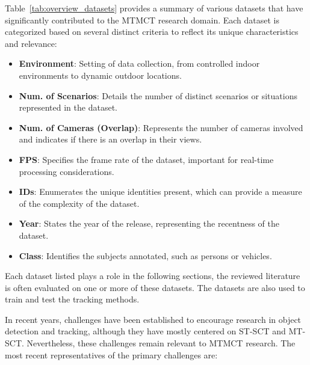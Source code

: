 Table~\ref{tab:overview_datasets} provides a summary of various datasets that have significantly contributed to the MTMCT research domain. Each dataset is categorized based on several distinct criteria to reflect its unique characteristics and relevance:

\begin{itemize}
    \item \textbf{Environment}: Setting of data collection, from controlled indoor environments to dynamic outdoor locations.
    \item \textbf{Num. of Scenarios}: Details the number of distinct scenarios or situations represented in the dataset.
    \item \textbf{Num. of Cameras (Overlap)}: Represents the number of cameras involved and indicates if there is an overlap in their views.
    \item \textbf{FPS}: Specifies the frame rate of the dataset, important for real-time processing considerations.
    \item \textbf{IDs}: Enumerates the unique identities present, which can provide a measure of the complexity of the dataset.
    \item \textbf{Year}: States the year of the release, representing the recentness of the dataset.
    \item \textbf{Class}: Identifies the subjects annotated, such as persons or vehicles.
\end{itemize}

Each dataset listed plays a role in the following sections, the reviewed literature is often evaluated on one or more of these datasets. The datasets are also used to train and test the tracking methods.

In recent years, challenges have been established to encourage research in object detection and tracking, although they have mostly centered on ST-SCT and MT-SCT. Nevertheless, these challenges remain relevant to MTMCT research. The most recent representatives of the primary challenges are:

